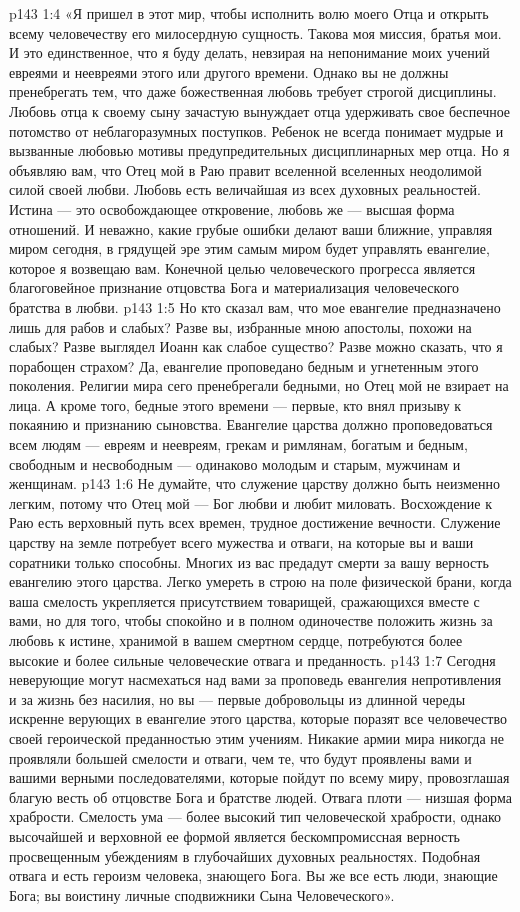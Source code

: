 \vs p143 1:4 «Я пришел в этот мир, чтобы исполнить волю моего Отца и открыть всему человечеству его милосердную сущность. Такова моя миссия, братья мои. И это единственное, что я буду делать, невзирая на непонимание моих учений евреями и неевреями этого или другого времени. Однако вы не должны пренебрегать тем, что даже божественная любовь требует строгой дисциплины. Любовь отца к своему сыну зачастую вынуждает отца удерживать свое беспечное потомство от неблагоразумных поступков. Ребенок не всегда понимает мудрые и вызванные любовью мотивы предупредительных дисциплинарных мер отца. Но я объявляю вам, что Отец мой в Раю правит вселенной вселенных неодолимой силой своей любви. Любовь есть величайшая из всех духовных реальностей. Истина --- это освобождающее откровение, любовь же --- высшая форма отношений. И неважно, какие грубые ошибки делают ваши ближние, управляя миром сегодня, в грядущей эре этим самым миром будет управлять евангелие, которое я возвещаю вам. Конечной целью человеческого прогресса является благоговейное признание отцовства Бога и материализация человеческого братства в любви.
\vs p143 1:5 Но кто сказал вам, что мое евангелие предназначено лишь для рабов и слабых? Разве вы, избранные мною апостолы, похожи на слабых? Разве выглядел Иоанн как слабое существо? Разве можно сказать, что я порабощен страхом? Да, евангелие проповедано бедным и угнетенным этого поколения. Религии мира сего пренебрегали бедными, но Отец мой не взирает на лица. А кроме того, бедные этого времени --- первые, кто внял призыву к покаянию и признанию сыновства. Евангелие царства должно проповедоваться всем людям --- евреям и неевреям, грекам и римлянам, богатым и бедным, свободным и несвободным --- одинаково молодым и старым, мужчинам и женщинам.
\vs p143 1:6 Не думайте, что служение царству должно быть неизменно легким, потому что Отец мой --- Бог любви и любит миловать. Восхождение к Раю есть верховный путь всех времен, трудное достижение вечности. Служение царству на земле потребует всего мужества и отваги, на которые вы и ваши соратники только способны. Многих из вас предадут смерти за вашу верность евангелию этого царства. Легко умереть в строю на поле физической брани, когда ваша смелость укрепляется присутствием товарищей, сражающихся вместе с вами, но для того, чтобы спокойно и в полном одиночестве положить жизнь за любовь к истине, хранимой в вашем смертном сердце, потребуются более высокие и более сильные человеческие отвага и преданность.
\vs p143 1:7 Сегодня неверующие могут насмехаться над вами за проповедь евангелия непротивления и за жизнь без насилия, но вы --- первые добровольцы из длинной череды искренне верующих в евангелие этого царства, которые поразят все человечество своей героической преданностью этим учениям. Никакие армии мира никогда не проявляли большей смелости и отваги, чем те, что будут проявлены вами и вашими верными последователями, которые пойдут по всему миру, провозглашая благую весть об отцовстве Бога и братстве людей. Отвага плоти --- низшая форма храбрости. Смелость ума --- более высокий тип человеческой храбрости, однако высочайшей и верховной ее формой является бескомпромиссная верность просвещенным убеждениям в глубочайших духовных реальностях. Подобная отвага и есть героизм человека, знающего Бога. Вы же все есть люди, знающие Бога; вы воистину личные сподвижники Сына Человеческого».
